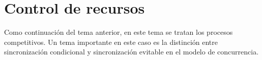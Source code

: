 \section{Control de recursos}

Como continuación del tema anterior, en este tema se tratan los procesos
competitivos. Un tema importante en este caso es la distinción entre
sincronización condicional y sincronización evitable en el modelo de
concurrencia.
